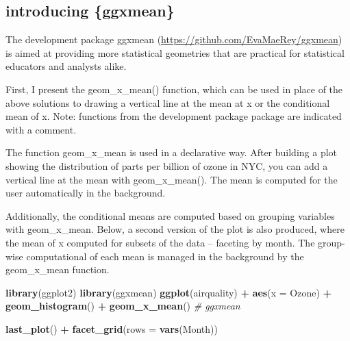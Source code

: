 \documentclass[12pt]{article}
\newenvironment{Shaded}{\begin{snugshade}}{\end{snugshade}}
\newcommand{\CommentTok}[1]{\textcolor[rgb]{0.56,0.35,0.01}{\textit{#1}}}
\newcommand{\DataTypeTok}[1]{\textcolor[rgb]{0.13,0.29,0.53}{#1}}
\newcommand{\KeywordTok}[1]{\textcolor[rgb]{0.13,0.29,0.53}{\textbf{#1}}}
\newcommand{\NormalTok}[1]{#1}
\newcommand{\OperatorTok}[1]{\textcolor[rgb]{0.81,0.36,0.00}{\textbf{#1}}}
\newcommand{\StringTok}[1]{\textcolor[rgb]{0.31,0.60,0.02}{#1}}
\begin{document}
\hypertarget{introducing-ggxmean}{%
\subsection{introducing \{ggxmean\}}\label{introducing-ggxmean}}

The development package ggxmean
(\url{https://github.com/EvaMaeRey/ggxmean}) is aimed at providing more
statistical geometries that are practical for statistical educators and
analysts alike.

First, I present the geom\_x\_mean() function, which can be used in
place of the above solutions to drawing a vertical line at the mean at x
or the conditional mean of x. Note: functions from the development
package package are indicated with a comment.

The function geom\_x\_mean is used in a declarative way. After building
a plot showing the distribution of parts per billion of ozone in NYC,
you can add a vertical line at the mean with geom\_x\_mean(). The mean
is computed for the user automatically in the background.

Additionally, the conditional means are computed based on grouping
variables with geom\_x\_mean. Below, a second version of the plot is
also produced, where the mean of x computed for subsets of the data --
faceting by month. The group-wise computational of each mean is managed
in the background by the geom\_x\_mean function.

\begin{Shaded}
\begin{Highlighting}[]
\KeywordTok{library}\NormalTok{(ggplot2)}
\KeywordTok{library}\NormalTok{(ggxmean)}
\KeywordTok{ggplot}\NormalTok{(airquality) }\OperatorTok{+}\StringTok{ }
\StringTok{  }\KeywordTok{aes}\NormalTok{(}\DataTypeTok{x =}\NormalTok{ Ozone) }\OperatorTok{+}\StringTok{ }
\StringTok{  }\KeywordTok{geom_histogram}\NormalTok{() }\OperatorTok{+}\StringTok{ }
\StringTok{  }\KeywordTok{geom_x_mean}\NormalTok{() }\CommentTok{# ggxmean}
\end{Highlighting}
\end{Shaded}

\begin{Shaded}
\begin{Highlighting}[]
\KeywordTok{last_plot}\NormalTok{() }\OperatorTok{+}\StringTok{ }
\StringTok{  }\KeywordTok{facet_grid}\NormalTok{(}\DataTypeTok{rows =} \KeywordTok{vars}\NormalTok{(Month))}
\end{Highlighting}
\end{Shaded}
\end{document}
